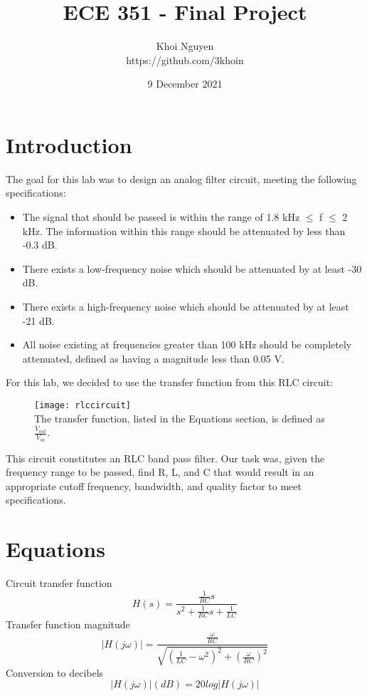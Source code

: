 \documentclass[11pt,a4,titlepage]{article}
\title{ECE 351 - Final Project}
\author{Khoi Nguyen \\ https://github.com/3khoin}
\date{9 December 2021}
\begin{document}
\maketitle
\pagebreak

\tableofcontents
\pagebreak

\section{Introduction}
The goal for this lab was to design an analog filter circuit, meeting the following specifications:
\begin{itemize}
	\item The signal that should be passed is within the range of 1.8 kHz $\leq$ f $\leq$ 2 kHz. The information within this range should be attenuated by less than -0.3 dB.
	\item There exists a low-frequency noise which should be attenuated by at least -30 dB.
	\item There exists a high-frequency noise which should be attenuated by at least -21 dB.
	\item All noise existing at frequencies greater than 100 kHz should be completely attenuated, defined as having a magnitude less than 0.05 V.
\end{itemize}

For this lab, we decided to use the transfer function from this RLC circuit:

\begin{figure}[H]
	\centering
	\texttt{[image: rlccircuit]}
	\\ The transfer function, listed in the Equations section, is defined as $\frac{V_{out}}{V_{in}}$.
\end{figure}

This circuit constitutes an RLC band pass filter. Our task was, given the frequency range to be passed, find R, L, and C that would result in an appropriate cutoff frequency, bandwidth, and quality factor to meet specifications.

\section{Equations}
Circuit transfer function
\[H(s) = \frac{\frac{1}{RC}s}{s^{2} + \frac{1}{RC}s + \frac{1}{LC}}\]
Transfer function magnitude
\[|H(j\omega)| = \frac{\frac{\omega}{RC}}{\sqrt{(\frac{1}{LC} - \omega^2)^{2} + (\frac{\omega}{RC})^{2}}}\]
Conversion to decibels
\[|H(j\omega)| (dB) = 20log|H(j\omega)|\]
\end{document}
